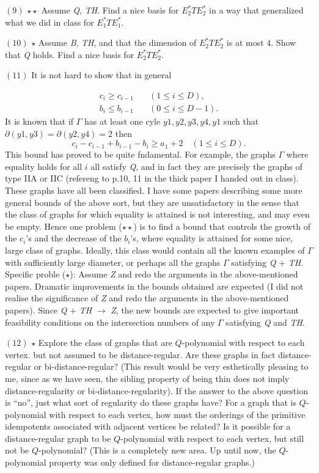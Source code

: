 \documentclass[
]{book}
\theoremstyle{definition}
\theoremstyle{definition}
\theoremstyle{definition}
\theoremstyle{definition}
\theoremstyle{remark}
\begin{document}
\hfill\break
\((9)\) \(\star\star\) Assume \emph{Q}, \emph{TH}. Find a nice basis for \(E^*_2TE^*_2\) in a way that generalized what we did in class for \(E^*_1TE^*_1\).

\hfill\break
\((10)\) \(\star\) Assume \emph{B}, \emph{TH}, and that the dimension of \(E^*_2TE^*_2\) is at most \(4\). Show that \emph{Q} holds. Find a nice basis for \(E^*_2TE^*_2\).

\hfill\break
\((11)\) It is not hard to show that in general

\begin{align}
c_i\geq c_{i-1} & \quad (1\leq i\leq D),\\
b_i \leq b_{i-1} & \quad (0\leq i\leq D-1).
\end{align}
It is known that if \(\Gamma\) has at least one cyle \(y1, y2, y3, y4, y1\) such that \(\partial(y1,y3) = \partial(y2,y4)=2\) then
\[c_i - c_{i-1} + b_{i-1} - b_i \geq a_1 + 2 \quad (1\leq i\leq D).\]
This bound has proved to be quite fndamental. For example, the graphs \(\Gamma\) where equality holds for all \(i\) all satisfy \emph{Q}, and in fact they are precisely the graphs of type IIA or IIC (refereng to p.10, 11 in the thick paper I handed out in class). These graphs have all been classified. I have some papers describing some more general bounds of the above sort, but they are unsatisfactory in the sense that the class of graphs for which equality is attained is not interesting, and may even be empty. Hence one problem (\(\star\star\)) is to find a bound that controls the growth of the \(c_i\)'s and the decrease of the \(b_i\)'s, where equality is attained for some nice, large class of graphs. Ideally, this class would contain all the known examples of \(\Gamma\) with sufficiently large diameter, or perhaps all the graphs \(\Gamma\) satisfying \emph{Q} \(+\) \emph{TH}. Specific proble (\(\star\)): Assume \emph{Z} and redo the arguments in the above-mentioned papers. Dramatic improvements in the bounds obtained are expected (I did not realise the significance of \emph{Z} and redo the arguments in the above-mentioned papers). Since \emph{Q} \(+\) \emph{TH} \(\to\) \emph{Z}, the new bounds are expected to give important feasibility conditions on the intersection numbers of any \(\Gamma\) satisfying \emph{Q} and \emph{TH}.

\hfill\break
\((12)\) \(\star\) Explore the class of graphs that are \(Q\)-polynomial with respect to each vertex. but not assumed to be distance-regular. Are these graphs in fact distance-regular or bi-distance-regular? (This result would be very esthetically pleasing to me, since as we have seen, the sibling property of being thin does not imply distance-regularity or bi-distance-regularity). If the answer to the above question is ``no'', just what sort of regularity do these graphs have? For a graph that is \(Q\)-polynomial with respect to each vertex, how must the orderings of the primitive idempotents associated with adjacent vertices be related? Is it possible for a distance-regular graph to be \(Q\)-polynomial with respect to each vertex, but still not be \(Q\)-polynomial? (This is a completely new area. Up until now, the \(Q\)-polynomial property was only defined for distance-regular graphs.)
\end{document}
